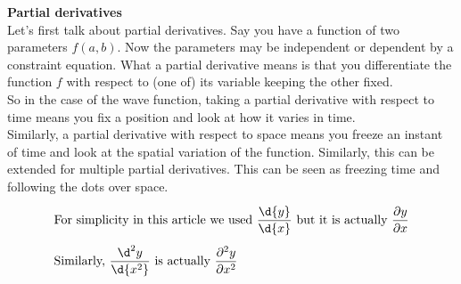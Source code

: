 \item \textbf{Partial derivatives}\\
    Let’s first talk about partial derivatives. Say you have a function of two parameters \( f(a, b) \). Now the parameters may be independent or dependent by a constraint equation. What a partial derivative means is that you differentiate the function \( f \) with respect to (one of) its variable keeping the other fixed.\\[2mm]So in the case of the wave function, taking a partial derivative with respect to time means you fix a position and look at how it varies in time. \\Similarly, a partial derivative with respect to space means you freeze an instant of time and look at the spatial variation of the function. Similarly, this can be extended for multiple partial derivatives. This can be seen as freezing time and following the dots over space.
    \begin{align*}
        \intertext{For simplicity in this article we used $\dfrac{\d{y}}{\d{x}}$ but it is actually $\dfrac{\partial{y}}{\partial{x}}$}
        \intertext{Similarly, $\dfrac{\d^2{y}}{\d{x^2}}$ is actually $\dfrac{\partial^2{y}}{\partial{x^2}}$}
    \end{align*}
    \begin{center}
    \end{center}